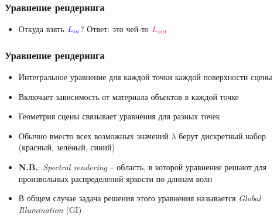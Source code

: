\documentclass[handout,10pt]{beamer}
\begin{document}
\begin{frame}[fragile]
\frametitle{Уравнение рендеринга}
\begin{itemize}
\item Откуда взять \begin{math}{\color{blue}L_{in}}\end{math}? \pause Ответ: это чей-то \begin{math}{\color{magenta}L_{out}}\end{math} 
\end{itemize}
\begin{center}
\end{center}
\end{frame}

\begin{frame}[fragile]
\frametitle{Уравнение рендеринга}
\begin{itemize}
\item Интегральное уравнение для каждой точки каждой поверхности сцены
\pause
\item Включает зависимость от материала объектов в каждой точке
\pause
\item Геометрия сцены связывает уравнения для разных точек
\pause
\item Обычно вместо всех возможных значений \begin{math}\lambda\end{math} берут дискретный набор ({\color{red}красный}, {\color{green}зелёный}, {\color{blue}синий})
\pause
\item \textbf{\alert{N.B.}}: \textit{Spectral rendering} -- область, в которой уравнение решают для произвольных распределений яркости по длинам волн
\pause
\item В общем случае задача решения этого уравнения называется \textit{Global Illumination} (GI)
\end{itemize}
\end{frame}
\end{document}
